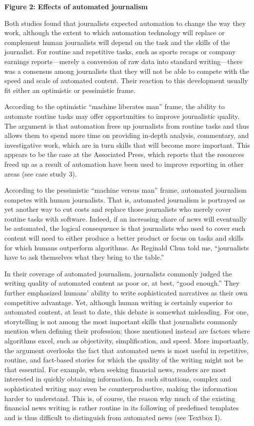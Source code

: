 \documentclass[notoc, symmetric, nobib, nols]{towcenter-book}
\begin{document}
\textbf{Figure 2: Effects of automated journalism}

Both studies found that journalists expected automation to change the way they work, although the extent to which automation technology will replace or complement human journalists will depend on the task and the skills of the journalist. For routine and repetitive tasks, such as sports recaps or company earnings reports---merely a conversion of raw data into standard writing---there was a consensus among journalists that they will not be able to compete with the speed and scale of automated content. Their reaction to this development usually fit either an optimistic or pessimistic frame. 

According to the optimistic ``machine liberates man'' frame, the ability to automate routine tasks may offer opportunities to improve journalistic quality. The argument is that automation frees up journalists from routine tasks and thus allows them to spend more time on providing in-depth analysis, commentary, and investigative work, which are in turn skills that will become more important. This appears to be the case at the Associated Press, which reports that the resources freed up as a result of automation have been used to improve reporting in other areas (see case study 3). 

According to the pessimistic ``machine versus man'' frame, automated journalism competes with human journalists. That is, automated journalism is portrayed as yet another way to cut costs and replace those journalists who merely cover routine tasks with software. Indeed, if an increasing share of news will eventually be automated, the logical consequence is that journalists who used to cover such content will need to either produce a better product or focus on tasks and skills for which humans outperform algorithms. As Reginald Chua told me, “journalists have to ask themselves what they bring to the table.”

In their coverage of automated journalism, journalists commonly judged the writing quality of automated content as poor or, at best, ``good enough.''  They further emphasized humans’ ability to write sophisticated narratives as their own competitive advantage. Yet, although human writing is certainly superior to automated content, at least to date, this debate is somewhat misleading. For one, storytelling is not among the most important skills that journalists commonly mention when defining their profession; those mentioned instead are factors where algorithms excel, such as objectivity, simplification, and speed.\cite{wei12} More importantly, the argument overlooks the fact that automated news is most useful in repetitive, routine, and fact-based stories for which the quality of the writing might not be that essential. For example, when seeking financial news, readers are most interested in quickly obtaining information. In such situations, complex and sophisticated writing may even be counterproductive, making the information harder to understand. This is, of course, the reason why much of the existing financial news writing is rather routine in its following of predefined templates and is thus difficult to distinguish from automated news (see Textbox I). 
\end{document}
